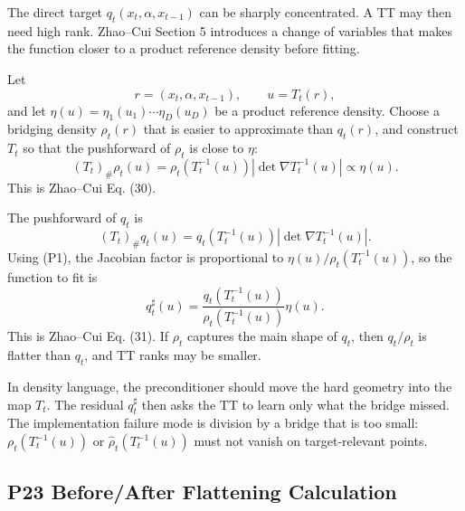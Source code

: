 \documentclass[11pt]{article}
\begin{document}
The direct target \(q_t(x_t,\alpha,x_{t-1})\) can be sharply concentrated.  A TT
may then need high rank.  Zhao--Cui Section 5 introduces a change of variables
that makes the function closer to a product reference density before fitting.

Let
\[
    r=(x_t,\alpha,x_{t-1}),\qquad u=T_t(r),
\]
and let \(\eta(u)=\eta_1(u_1)\cdots\eta_D(u_D)\) be a product reference density.
Choose a bridging density \(\rho_t(r)\) that is easier to approximate than
\(q_t(r)\), and construct \(T_t\) so that the pushforward of \(\rho_t\) is close
to \(\eta\):
\[
    (T_t)_\#\rho_t(u)
    =
    \rho_t(T_t^{-1}(u))
    \left|\det\nabla T_t^{-1}(u)\right|
    \propto
    \eta(u).
    \tag{P1}
\]
This is Zhao--Cui Eq. (30).

The pushforward of \(q_t\) is
\[
    (T_t)_\#q_t(u)
    =
    q_t(T_t^{-1}(u))
    \left|\det\nabla T_t^{-1}(u)\right|.
\]
Using (P1), the Jacobian factor is proportional to
\(\eta(u)/\rho_t(T_t^{-1}(u))\), so the function to fit is
\[
    q^\sharp_t(u)
    =
    \frac{q_t(T_t^{-1}(u))}
    {\rho_t(T_t^{-1}(u))}
    \eta(u).
    \tag{P2}
\]
This is Zhao--Cui Eq. (31).  If \(\rho_t\) captures the main shape of \(q_t\),
then \(q_t/\rho_t\) is flatter than \(q_t\), and TT ranks may be smaller.

In density language, the preconditioner should move the hard geometry into the
map \(T_t\).  The residual \(q_t^\sharp\) then asks the TT to learn only what
the bridge missed.  The implementation failure mode is division by a bridge
that is too small: \(\rho_t(T_t^{-1}(u))\) or \(\widehat\rho_t(T_t^{-1}(u))\)
must not vanish on target-relevant points.

\subsection*{P23 Before/After Flattening Calculation}
\end{document}

